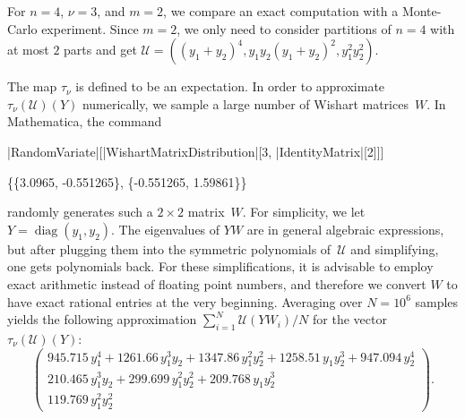 \documentclass[smallextended]{svjour3}
\DeclareMathOperator{\diag}{diag}
\begin{document}
\begin{example}
  For $n=4$, $\nu=3$, and $m=2$, we compare an exact computation with a
  Monte-Carlo experiment.  Since $m=2$, we only need to consider partitions
  of $n=4$ with at most $2$ parts and get $\mathcal{U}=\left((y_1+y_2)^4,
  y_1y_2(y_1+y_2)^2, y_1^2y_2^2\right)$. 

  The map $\tau_\nu$ is defined to be an expectation. In order to approximate
  $\tau_\nu(\mathcal{U})(Y)$ numerically, we sample a large number of Wishart
  matrices~$W$. In Mathematica, the command
  \begin{mma}
    \In |RandomVariate|[|WishartMatrixDistribution|[3, |IdentityMatrix|[2]]] \\
    \Out \rule{0pt}{8pt}\{\{3.0965, -0.551265\}, \{-0.551265, 1.59861\}\} \\
  \end{mma}
  \noindent
  randomly generates such a $2\times2$ matrix~$W$. For simplicity, we let
  $Y=\diag(y_1,y_2)$. The eigenvalues of $YW$ are in general algebraic
  expressions, but after plugging them into the symmetric polynomials
  of~$\mathcal{U}$ and simplifying, one gets polynomials back. For these
  simplifications, it is advisable to employ exact arithmetic instead of
  floating point numbers, and therefore we convert $W$ to have exact rational
  entries at the very beginning. Averaging over $N=10^6$ samples yields the
  following approximation $\sum_{i=1}^N \mathcal{U}(YW_i)/N$ for the vector
  $\tau_\nu(\mathcal{U})(Y)$:
  \[
    \begin{pmatrix}
      945.715\,y_1^4 + 1261.66\,y_1^3y_2 + 1347.86\,y_1^2y_2^2 + 1258.51\,y_1y_2^3 + 947.094\,y_2^4 \\
      210.465\,y_1^3y_2 + 299.699\,y_1^2y_2^2 + 209.768\,y_1y_2^3 \\
      119.769\,y_1^2 y_2^2
    \end{pmatrix}.
  \]


\end{example}
\end{document}
